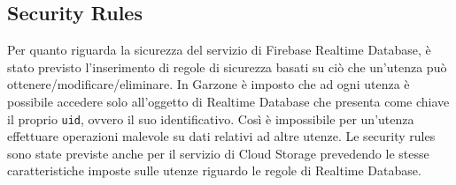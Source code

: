 \subsection{Security Rules}
Per quanto riguarda la sicurezza del servizio di Firebase Realtime Database, è stato previsto l'inserimento di regole di sicurezza basati su ciò che un'utenza può ottenere/modificare/eliminare. In Garzone è imposto che ad ogni utenza è possibile accedere solo all'oggetto di Realtime Database che presenta come chiave il proprio \lstinline[basicstyle=\ttfamily]!uid!, ovvero il suo identificativo. Così è impossibile per un'utenza effettuare operazioni malevole su dati relativi ad altre utenze. Le security rules sono state previste anche per il servizio di Cloud Storage prevedendo le stesse caratteristiche imposte sulle utenze riguardo le regole di Realtime Database.